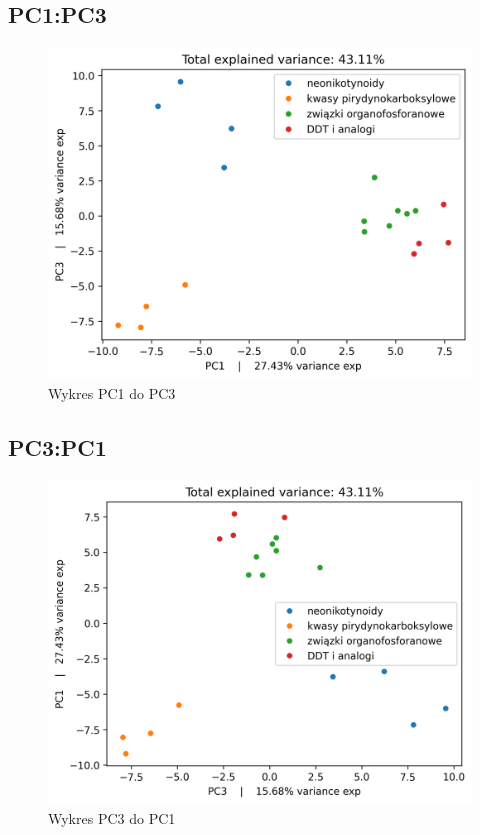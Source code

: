 \documentclass[12pt, a4paper]{article}
\begin{document}
    \subsection*{PC1:PC3}
        \begin{figure}[H]
            \centering
            \includegraphics{13.png}
            \caption{Wykres PC1 do PC3}
        \end{figure}

    \subsection*{PC3:PC1}
        \begin{figure}[H]
            \centering
            \includegraphics{31.png}
            \caption{Wykres PC3 do PC1}
        \end{figure}
    
\end{document}
